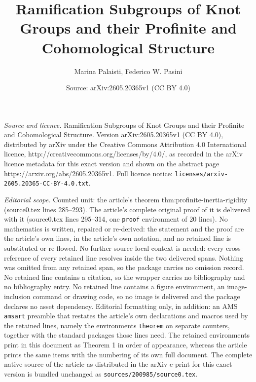 \documentclass[10pt,a4paper]{amsart}
\title{Ramification Subgroups of Knot Groups and their Profinite and Cohomological Structure}
\author{Marina Palaisti, Federico W. Pasini}
\date{Source: arXiv:2605.20365v1 (CC BY 4.0)}
\begin{document}
\maketitle

\noindent\emph{Source and licence.} Ramification Subgroups of Knot Groups and their Profinite and Cohomological Structure. Version arXiv:2605.20365v1 (CC BY 4.0), distributed by arXiv under the Creative Commons Attribution 4.0 International licence, http://creativecommons.org/licenses/by/4.0/, as recorded in the arXiv licence metadata for this exact version and shown on the abstract page https://arxiv.org/abs/2605.20365v1. Full licence notice: \texttt{licenses/arxiv-2605.20365-CC-BY-4.0.txt}.\par\smallskip

\noindent\textit{Editorial scope.} Counted unit: the article's theorem thm:profinite-inertia-rigidity (source0.tex lines 285--293). The article's complete original proof of it is delivered with it (source0.tex lines 295--314, one \texttt{proof} environment of 20 lines). No mathematics is written, repaired or re-derived: the statement and the proof are the article's own lines, in the article's own notation, and no retained line is substituted or re-flowed.  No further source-local context is needed: every cross-reference of every retained line resolves inside the two delivered spans.  Nothing was omitted from any retained span, so the package carries no omission record.  No retained line contains a citation, so the wrapper carries no bibliography and no bibliography entry.  No retained line contains a figure environment, an image-inclusion command or drawing code, so no image is delivered and the package declares no asset dependency.  Editorial formatting only, in addition: an AMS \texttt{amsart} preamble that restates the article's own declarations and macros used by the retained lines, namely the environments \texttt{theorem} on separate counters, together with the standard packages those lines need.  The retained environments print in this document as Theorem 1 in order of appearance, whereas the article prints the same items with the numbering of its own full document.  The complete native source of the article as distributed in the arXiv e-print for this exact version is bundled unchanged as \texttt{sources/200985/source0.tex}.
\end{document}
